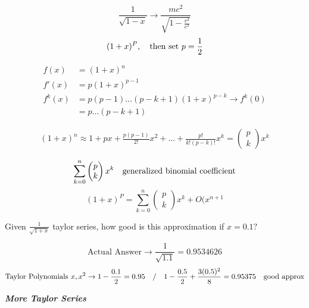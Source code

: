\documentclass[svgnames]{article}   	%
\begin{document}
\vspace{5px} \[
\frac{1}{ \sqrt{1-x}} \rightarrow \frac{mc^2}{ \sqrt{1 - \frac{v^2}{c^2}}}
\] \vspace{5px}
\[
  (1+x)^P, \hspace{10px} \text{then set $p = \frac{1}{2}$}
\]

\begin{align*}
  f(x) &= (1+x)^n  \\ f'(x) &= p(1+x)^{p-1}  \\ f^k (x)  &= p(p-1) \dots
  (p-k+1)(1+x)^{p-k} \rightarrow f^k (0) \\ &= p \dots (p-k+1) 
\end{align*}

\begin{align*}
  (1+x)^n \approx 1 + px + \frac{p(p-1)}{2!}x^2 + ... + \frac{p!}{k!(p-k)!}x^k
  = \begin{pmatrix} p \\ k \end{pmatrix}x^k
\end{align*}

\vspace{5px} \[
  \sum_{k=0}^{n} \begin{pmatrix} p \\ k \end{pmatrix} x^k \hspace{10px}
  \text{generalized binomial coefficient} 
\] \vspace{5px}
\vspace{5px} \[
  (1+x)^P = \sum_{k=0}^{n} \begin{pmatrix} p \\ k \end{pmatrix} x^k + O(x^{n+1}
\] \vspace{5px}

\begin{tcolorbox}[colback = red!5!white, colframe = red!50!black, title
  = Question]
  
  Given $\frac{1}{ \sqrt{1+x}}$ taylor series, how good is this approximation
  if $x=0.1$? 

\end{tcolorbox}
\begin{tcolorbox}[colback = blue!5!white, colframe = blue!50!black, title
  = Solution]
\vspace{5px} \[
  \text{Actual Answer} \rightarrow  \frac{1}{\sqrt{1.1}} = 0.9534626
\] \vspace{5px}
\[
  \text{Taylor Polynomials $x, x^2$} \rightarrow 1 - \frac{0.1}{2} = 0.95
  \hspace{10px} / \hspace{10px} 1 - \frac{0.5}{2} + \frac{3(0.5)^2}{8}
  = 0.95375 \hspace{10px} \text{good approx}
\] \end{tcolorbox}
\vspace{5px}
\textit{ \textbf{More Taylor Series}}
\end{document}
